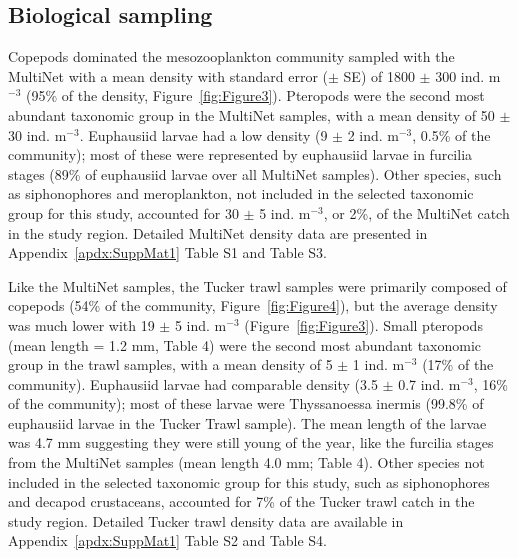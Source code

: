 \subsection{Biological sampling}
Copepods dominated the mesozooplankton community sampled with the MultiNet with a mean density with standard error ($\pm$ SE) of 1800 $\pm$ 300 ind. m$^{-3}$ (95\% of the density, Figure~\ref{fig:Figure3}). Pteropods were the second most abundant taxonomic group in the MultiNet samples, with a mean density of 50 $\pm$ 30 ind. m$^{-3}$. Euphausiid larvae had a low density (9 $\pm$ 2 ind. m$^{-3}$, 0.5\% of the community); most of these were represented by euphausiid larvae in furcilia stages (89\% of euphausiid larvae over all MultiNet samples). Other species, such as siphonophores and meroplankton, not included in the selected taxonomic group for this study, accounted for 30 $\pm$ 5 ind. m$^{-3}$, or 2\%, of the MultiNet catch in the study region. Detailed MultiNet density data are presented in Appendix~\ref{apdx:SuppMat1} Table S1 and Table S3. 
 

Like the MultiNet samples, the Tucker trawl samples were primarily composed of copepods (54\% of the community, Figure~\ref{fig:Figure4}), but the average density was much lower with 19 $\pm$ 5 ind. m$^{-3}$ (Figure~\ref{fig:Figure3}). Small pteropods (mean length = 1.2 mm, Table 4) were the second most abundant taxonomic group in the trawl samples, with a mean density of 5 $\pm$ 1 ind. m$^{-3}$ (17\% of the community). Euphausiid larvae had comparable density (3.5 $\pm$ 0.7 ind. m$^{-3}$, 16\% of the community); most of these larvae were Thyssanoessa inermis (99.8\% of euphausiid larvae in the Tucker Trawl sample). The mean length of the larvae was 4.7 mm suggesting they were still young of the year, like the furcilia stages from the MultiNet samples (mean length 4.0 mm; Table 4). Other species not included in the selected taxonomic group for this study, such as siphonophores and decapod crustaceans, accounted for 7\% of the Tucker trawl catch in the study region. Detailed Tucker trawl density data are available in Appendix~\ref{apdx:SuppMat1} Table S2 and Table S4.

